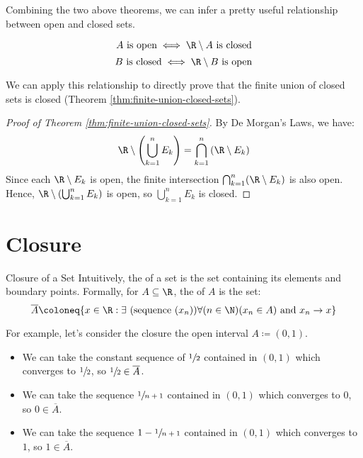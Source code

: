 Combining the two above theorems, we can infer a pretty useful relationship between open and closed sets.

\[ A\ \text{is open} \iff \R \setminus A\ \text{is closed} \]
\[ B\ \text{is closed} \iff \R \setminus B\ \text{is open} \]

We can apply this relationship to directly prove that the finite union of closed sets is closed (Theorem \ref{thm:finite-union-closed-sets}).

\begin{proof}[Proof of Theorem \ref{thm:finite-union-closed-sets}]
    By De Morgan's Laws, we have:
    \[ \R \setminus \left( \bigcup_{k=1}^n E_k \right) = \bigcap_{k=1}^{n} \left( \R \setminus E_k \right) \]
    Since each $\R \setminus E_k$ is open, the finite intersection $\bigcap_{k=1}^n (\R \setminus E_k)$ is also open. Hence, $\R \setminus \left( \bigcup_{k=1}^n E_k \right)$ is open, so $\bigcup_{k=1}^n E_k$ is closed.
\end{proof}

\section{Closure}

\begin{dfnbox}{Closure of a Set}{}
    Intuitively, the  of a set is the set containing its elements and boundary points.
    \tcblower
    Formally, for $A \subseteq \R$, the  of $A$ is the set:
    \[ \overline{A} \coloneq \{ x \in \R : \exists\ (\text{sequence}\ (x_n)) \forall(n \in \N)(x_n \in A)\ \text{and}\ x_n \to x \} \]
\end{dfnbox}

For example, let's consider the closure the open interval $ A \coloneq (0,1)$.
\begin{itemize}
    \item We can take the constant sequence of $\sfrac{1}{2}$ contained in $(0,1)$ which converges to $\sfrac{1}{2}$, so $\sfrac{1}{2} \in \overline{A}$.
    \item We can take the sequence $\sfrac{1}{n+1}$ contained in $(0,1)$ which converges to $0$, so $0 \in \overline{A}$.
    \item We can take the sequence $1 - \sfrac{1}{n+1}$ contained in $(0,1)$ which converges to $1$, so $1 \in \overline{A}$.
\end{itemize}

